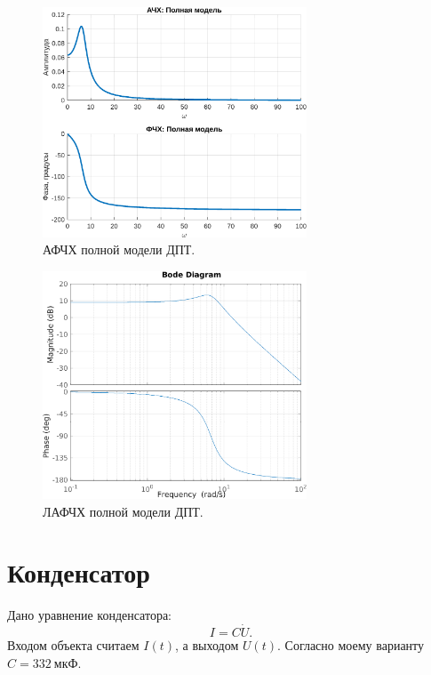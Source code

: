 \begin{figure}[H]
    \centering
    \includegraphics[width=0.7\textwidth]{figs/task_2_АФЧХ.png}
    \caption{АФЧХ полной модели ДПТ.}
    \label{fig:task_2_АФЧХ}
\end{figure}

\begin{figure}[H]
    \centering
    \includegraphics[width=0.7\textwidth]{figs/task_2_ЛАФЧХ.png}
    \caption{ЛАФЧХ полной модели ДПТ.}
    \label{fig:task_2_ЛАФЧХ}
\end{figure}


\section{Конденсатор}

Дано уравнение конденсатора:
\begin{equation*}
    I=C\dot U.
\end{equation*}
Входом объекта считаем $I(t)$, а выходом $U(t)$. Согласно моему варианту $C=332\ \text{мкФ}$.


